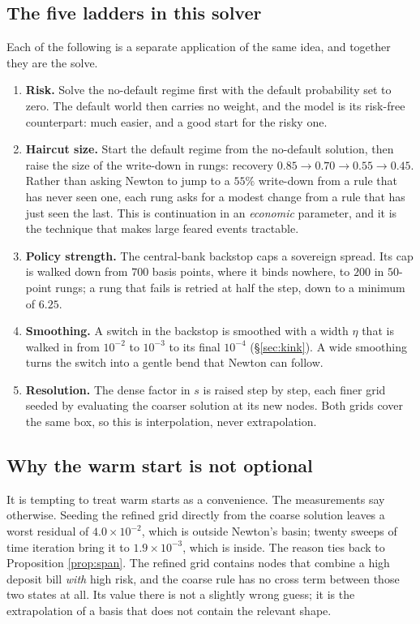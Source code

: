 \documentclass[10pt,a4paper]{article}
\theoremstyle{plain}
\theoremstyle{remark}
\begin{document}
\subsection{The five ladders in this solver}

Each of the following is a separate application of the same idea, and together they are the
solve.

\begin{enumerate}
\item \textbf{Risk.} Solve the no-default regime first with the default probability set to zero.
The default world then carries no weight, and the model is its risk-free counterpart: much
easier, and a good start for the risky one.
\item \textbf{Haircut size.} Start the default regime from the no-default solution, then raise the
size of the write-down in rungs: recovery $0.85\to0.70\to0.55\to0.45$. Rather than asking Newton to
jump to a $55\%$ write-down from a rule that has never seen one, each rung asks for a modest change
from a rule that has just seen the last. This is continuation in an \emph{economic} parameter, and it
is the technique that makes large feared events tractable.
\item \textbf{Policy strength.} The central-bank backstop caps a sovereign spread. Its cap is walked
down from $700$ basis points, where it binds nowhere, to $200$ in $50$-point rungs; a rung that
fails is retried at half the step, down to a minimum of $6.25$.
\item \textbf{Smoothing.} A switch in the backstop is smoothed with a width $\eta$ that is walked in
from $10^{-2}$ to $10^{-3}$ to its final $10^{-4}$ (\S\ref{sec:kink}). A wide smoothing turns the
switch into a gentle bend that Newton can follow.
\item \textbf{Resolution.} The dense factor in $s$ is raised step by step, each finer grid seeded by
evaluating the coarser solution at its new nodes. Both grids cover the same box, so this is
interpolation, never extrapolation.
\end{enumerate}

\subsection{Why the warm start is not optional}

It is tempting to treat warm starts as a convenience. The measurements say otherwise. Seeding the
refined grid directly from the coarse solution leaves a worst residual of $4.0\times10^{-2}$, which is
outside Newton's basin; twenty sweeps of time iteration bring it to $1.9\times10^{-3}$, which is inside.
The reason ties back to Proposition \ref{prop:span}. The refined grid contains nodes that combine a
high deposit bill \emph{with} high risk, and the coarse rule has no cross term between those two
states at all. Its value there is not a slightly wrong guess; it is the extrapolation of a basis
that does not contain the relevant shape.
\end{document}

